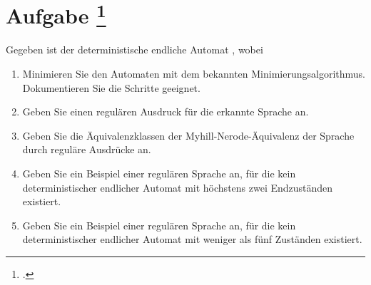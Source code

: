 \documentclass{bschlangaul-aufgabe}
\begin{document}
\section{Aufgabe
\footcite{examen:66115:2016:09}}

Gegeben ist der deterministische endliche Automat ,
wobei

\begin{enumerate}
\item Minimieren Sie den Automaten mit dem bekannten
Minimierungsalgorithmus. Dokumentieren Sie die Schritte geeignet.

\item Geben Sie einen regulären Ausdruck für die erkannte Sprache an.

\item Geben Sie die Äquivalenzklassen der Myhill-Nerode-Äquivalenz der
Sprache durch reguläre Ausdrücke an.

\item Geben Sie ein Beispiel einer regulären Sprache an, für die kein
deterministischer endlicher Automat mit höchstens zwei Endzuständen
existiert.

\item Geben Sie ein Beispiel einer regulären Sprache an, für die kein
deterministischer endlicher Automat mit weniger als fünf Zuständen
existiert.
\end{enumerate}
\end{document}
